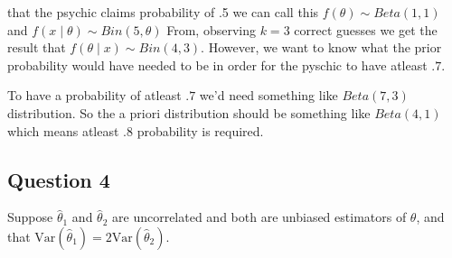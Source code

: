\documentclass{tufte-book}
\newcommand{\Var}{\mathrm{Var}}
\theoremstyle{mytheoremstyle}
\theoremstyle{mylemstyle}
\theoremstyle{mydefstyle}
\begin{document}
 that the psychic claims probability of .5 we can call this $f(\theta) \sim Beta(1,1)$ and $f(x\mid \theta) \sim Bin(5, \theta)$  From, observing $k=3$ correct guesses we get the result that $f(\theta \mid x) \sim Bin(4,3)$.  However, we want to know what the prior probability would have needed to be in order for the pyschic to have atleast $.7$.

To have a probability of atleast $.7$ we'd need something like $Beta(7,3)$ distribution.  So the a priori distribution should be something like $Beta(4,1)$ which means atleast .8 probability is required.

\subsection{Question 4}

Suppose $\hat{\theta}_1$ and $\hat{\theta}_2$ are uncorrelated and both are unbiased estimators of $\theta$, and that $\Var(\hat{\theta}_1) = 2\Var(\hat{\theta}_2)$.
\end{document}
